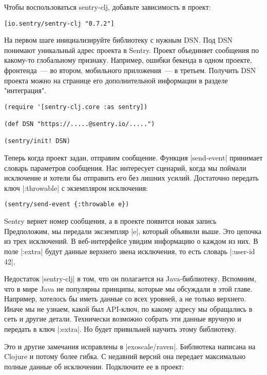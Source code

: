 Чтобы воспользоваться sentry-clj, добавьте зависимость в проект:

\begin{verbatim}
[io.sentry/sentry-clj "0.7.2"]
\end{verbatim}

На первом шаге инициализируйте библиотеку с нужным DSN. Под DSN понимают
уникальный адрес проекта в Sentry. Проект объединяет сообщения по какому-то
глобальному признаку. Например, ошибки бекенда в одном проекте, фронтенда~--- во
втором, мобильного приложения~--- в третьем. Получить DSN проекта можно на
странице его дополнительной информации в разделе "интеграция".

\begin{verbatim}
(require '[sentry-clj.core :as sentry])

(def DSN "https://.....@sentry.io/.....")

(sentry/init! DSN)
\end{verbatim}

Теперь когда проект задан, отправим сообщение. Функция \spverb|send-event| принимает
словарь параметров сообщения. Нас интересует сценарий, когда мы поймали
исключение и хотели бы отправить его без лишних усилий. Достаточно передать ключ
\spverb|:throwable| с экземпляром исключения:

\begin{verbatim}
(sentry/send-event {:throwable e})
\end{verbatim}

Sentry вернет номер сообщения, а в проекте появится новая запись Предположим, мы
передали эксземпляр \spverb|e|, который объявили выше. Это цепочка из трех
исключений. В веб-интерфейсе увидим информацию о каждом из них. В поле \spverb|:extra|
будут данные верхнего звена исключения, то есть словарь \spverb|{:user-id 42}|.

Недостаток \spverb|sentry-clj| в том, что он полагается на Java-библиотеку. Вспомним,
что в мире Java не популярны принципы, которые мы обсуждали в этой
главе. Например, хотелось бы иметь данные со всех уровней, а не только
верхнего. Иначе мы не узнаем, какой был API-ключ, по какому адресу мы обращались
в сеть и другие детали. Технически возможно собрать эти данные вручную и
передать в ключ \spverb|:extra|. Но будет привильней научить этому библиотеку.

Это и другие замечания исправлены в \spverb|exoscale/raven|. Библиотека написана на
Clojure и потому более гибка. С недавний версий она передает максимально полные
данные об исключении. Подключите ее в проект:

